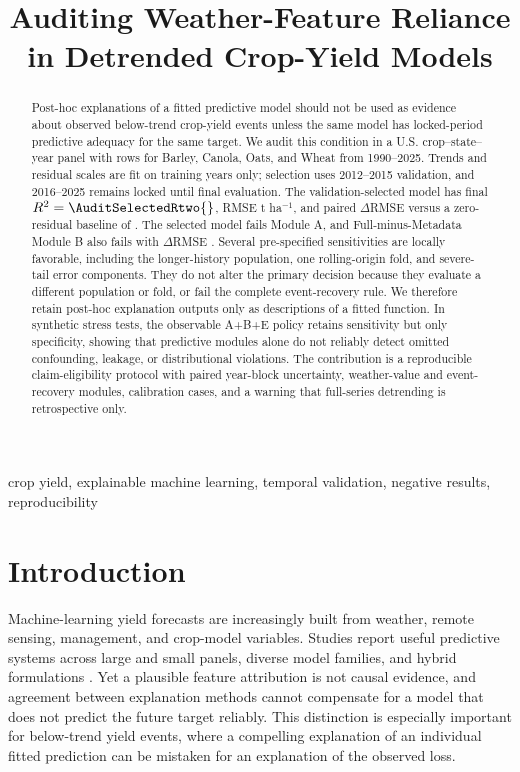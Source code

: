 \documentclass[conference]{IEEEtran}
\title{Auditing Weather-Feature Reliance in Detrended Crop-Yield Models}
\author{\IEEEauthorblockN{Anonymous Submission}}
\begin{document}
\maketitle

\begin{abstract}
Post-hoc explanations of a fitted predictive model should not be used as evidence
about observed below-trend crop-yield events unless the same model has locked-period
predictive adequacy for the same target. We audit this condition in a U.S.
crop--state--year panel with
\AuditTotalRows{} rows for Barley, Canola, Oats, and Wheat from 1990--2025.
Trends and residual scales are fit on training years only; selection uses
2012--2015 validation, and 2016--2025 remains locked until final evaluation. The
validation-selected \AuditSelectedModel{} \AuditSelectedFamily{} model has final
$R^2=\AuditSelectedRtwo{}$, RMSE \AuditSelectedRMSE{} t ha$^{-1}$, and paired
$\Delta$RMSE versus a zero-residual baseline of \AuditSelectedDeltaRMSE{}
\AuditGateACI{}. The selected model fails Module A, and Full-minus-Metadata Module B
also fails with $\Delta$RMSE \AuditGateBOneDeltaRMSE{} \AuditGateBOneCI{}.
Several pre-specified sensitivities are locally favorable, including the
longer-history population, one rolling-origin fold, and severe-tail error
components. They do not alter the primary decision because they evaluate a
different population or fold, or fail the complete event-recovery rule. We
therefore retain post-hoc explanation outputs only as descriptions of a fitted
function. In synthetic stress tests, the observable A+B+E policy retains
\SyntheticPolicySensitivity{} sensitivity but only \SyntheticPolicySpecificity{}
specificity, showing that predictive modules alone do not reliably detect omitted
confounding, leakage, or distributional violations. The contribution is a
reproducible claim-eligibility protocol with paired year-block uncertainty,
weather-value and event-recovery modules, calibration cases, and a warning that
full-series detrending is retrospective only.
\end{abstract}

\begin{IEEEkeywords}
crop yield, explainable machine learning, temporal validation, negative results,
reproducibility
\end{IEEEkeywords}

\section{Introduction}
Machine-learning yield forecasts are increasingly built from weather, remote
sensing, management, and crop-model variables. Studies report useful predictive
systems across large and small panels, diverse model families, and hybrid
formulations \cite{Paudel2021,Meroni2021,LengHall2020,Klompenburg2020}.
Yet a plausible feature attribution is not causal evidence, and agreement between
explanation methods cannot compensate for a model that does not predict the future
target reliably. This distinction is especially important for below-trend yield
events, where a compelling explanation of an individual fitted prediction can be
mistaken for an explanation of the observed loss.
\end{document}
